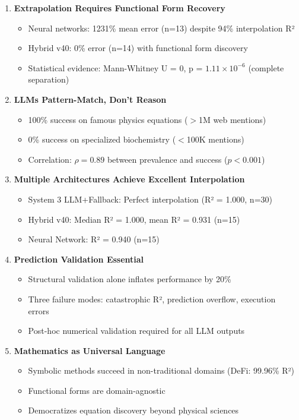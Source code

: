 \begin{enumerate}
    \item \textbf{Extrapolation Requires Functional Form Recovery}
    \begin{itemize}
        \item Neural networks: 1231\% mean error (n=13) despite 94\% interpolation R²
        \item Hybrid v40: 0\% error (n=14) with functional form discovery
        \item Statistical evidence: Mann-Whitney U = 0, p = $1.11 \times 10^{-6}$ (complete separation)
    \end{itemize}

    \item \textbf{LLMs Pattern-Match, Don't Reason}
    \begin{itemize}
        \item 100\% success on famous physics equations ($>$1M web mentions)
        \item 0\% success on specialized biochemistry ($<$100K mentions)
        \item Correlation: $\rho = 0.89$ between prevalence and success ($p < 0.001$)
    \end{itemize}

    \item \textbf{Multiple Architectures Achieve Excellent Interpolation}
    \begin{itemize}
        \item System 3 LLM+Fallback: Perfect interpolation (R² = 1.000, n=30)
        \item Hybrid v40: Median R² = 1.000, mean R² = 0.931 (n=15)
        \item Neural Network: R² = 0.940 (n=15)
    \end{itemize}

    \item \textbf{Prediction Validation Essential}
    \begin{itemize}
        \item Structural validation alone inflates performance by 20\%
        \item Three failure modes: catastrophic R², prediction overflow, execution errors
        \item Post-hoc numerical validation required for all LLM outputs
    \end{itemize}

    \item \textbf{Mathematics as Universal Language}
    \begin{itemize}
        \item Symbolic methods succeed in non-traditional domains (DeFi: 99.96\% R²)
        \item Functional forms are domain-agnostic
        \item Democratizes equation discovery beyond physical sciences
    \end{itemize}
\end{enumerate}

